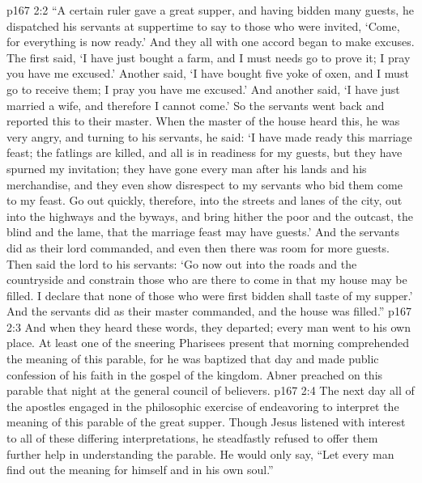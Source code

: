 \vs p167 2:2 \textcolor{ubdarkred}{“A certain ruler gave a great supper, and having bidden many guests, he dispatched his servants at suppertime to say to those who were invited, ‘Come, for everything is now ready.’ And they all with one accord began to make excuses. The first said, ‘I have just bought a farm, and I must needs go to prove it; I pray you have me excused.’ Another said, ‘I have bought five yoke of oxen, and I must go to receive them; I pray you have me excused.’ And another said, ‘I have just married a wife, and therefore I cannot come.’ So the servants went back and reported this to their master. When the master of the house heard this, he was very angry, and turning to his servants, he said: ‘I have made ready this marriage feast; the fatlings are killed, and all is in readiness for my guests, but they have spurned my invitation; they have gone every man after his lands and his merchandise, and they even show disrespect to my servants who bid them come to my feast. Go out quickly, therefore, into the streets and lanes of the city, out into the highways and the byways, and bring hither the poor and the outcast, the blind and the lame, that the marriage feast may have guests.’ And the servants did as their lord commanded, and even then there was room for more guests. Then said the lord to his servants: ‘Go now out into the roads and the countryside and constrain those who are there to come in that my house may be filled. I declare that none of those who were first bidden shall taste of my supper.’ And the servants did as their master commanded, and the house was filled.”}\plusone
\pc \vs p167 2:3 And when they heard these words, they departed; every man went to his own place. At least one of the sneering Pharisees present that morning comprehended the meaning of this parable, for he was baptized that day and made public confession of his faith in the gospel of the kingdom. Abner preached on this parable that night at the general council of believers.
\vs p167 2:4 The next day all of the apostles engaged in the philosophic exercise of endeavoring to interpret the meaning of this parable of the great supper. Though Jesus listened with interest to all of these differing interpretations, he steadfastly refused to offer them further help in understanding the parable. He would only say, \textcolor{ubdarkred}{“Let every man find out the meaning for himself and in his own soul.”}

